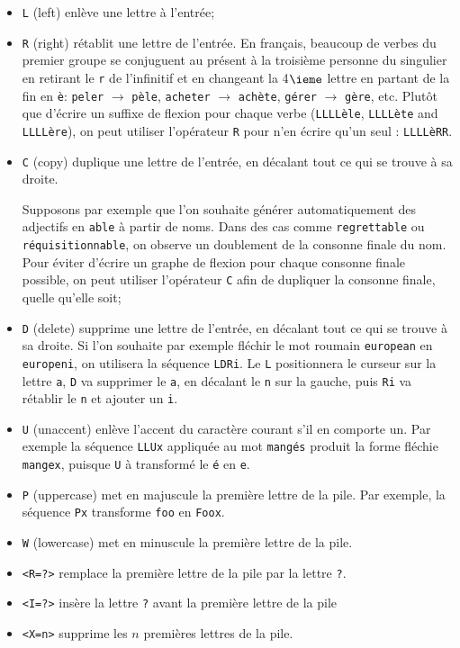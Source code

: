 \begin{itemize}
\item \verb+L+ (left) enlève une lettre à l’entrée;
  	  
\item \verb+R+ (right) rétablit une lettre de l’entrée. En français, beaucoup de verbes du premier
  	  groupe se conjuguent au présent à la troisième personne du singulier en retirant le
  	  \verb+r+ de l’infinitif et en changeant la 4$\ieme$ lettre en partant de la fin en
  	  \texttt{è}: \verb+peler+ $\rightarrow$ \texttt{pèle},
  	  \verb+acheter+ $\rightarrow$ \texttt{achète}, \texttt{gérer}
  	  $\rightarrow$ \texttt{gère}, etc. Plutôt que d’écrire un suffixe de flexion
  	  pour chaque verbe (\texttt{LLLLèle}, \texttt{LLLLète} and
  	  \texttt{LLLLère}), on peut utiliser l’opérateur \verb+R+ pour n’en écrire qu’un seul :
  	  \texttt{LLLLèRR}.
  	  
\item \verb+C+ (copy) duplique une lettre de l’entrée, en décalant tout ce qui se trouve à sa
  	  droite.
  	  
Supposons par exemple que l’on souhaite générer automatiquement des adjectifs en
\verb+able+ à partir de noms. Dans des cas comme \verb+regrettable+ ou \verb+réquisitionnable+,
  on observe un doublement de la consonne finale du nom. Pour éviter d’écrire un
graphe de flexion pour chaque consonne finale possible, on peut utiliser l’opérateur
\verb+C+ afin de dupliquer la consonne finale, quelle qu’elle soit;
  
  \item \verb+D+ (delete) supprime une lettre de l’entrée, en décalant tout ce qui se trouve à sa
  	  droite.
Si l’on souhaite par exemple fléchir le mot roumain \verb+european+ en \verb+europeni+, on utilisera
la séquence \verb+LDRi+. Le \verb+L+ positionnera le curseur sur la lettre \verb+a+, \verb+D+ va
supprimer le \verb+a+, en décalant le \verb+n+ sur la gauche, puis \verb+Ri+ va rétablir le \verb+n+
et ajouter un \verb+i+.

\item \verb+U+ (unaccent) enlève l'accent du caractère courant s'il en comporte un.
	Par exemple la séquence \verb+LLUx+ appliquée au mot
	\texttt{mangés} produit la forme fléchie \verb+mangex+, puisque \verb+U+
	à transformé le \texttt{é} en \verb+e+.

\item \verb+P+ (uppercase) met en majuscule la première lettre de la pile. Par exemple, la séquence
	\verb$Px$ transforme \verb$foo$ en \verb$Foox$.
  
\item \verb+W+ (lowercase) met en minuscule la première lettre de la pile.

\item \verb+<R=?>+ remplace la première lettre de la pile par la lettre \verb+?+.

\item \verb+<I=?>+ insère la lettre \verb+?+ avant la première lettre de la pile 

\item \verb+<X=n>+ supprime les $n$ premières lettres de la pile.
\end{itemize}

